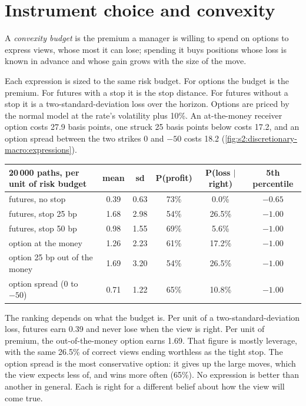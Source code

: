 \section{Instrument choice and convexity}

\begin{definition}\label{def:s2:discretionary-macro:convexity}
A \emph{convexity budget} is the premium a manager is willing to spend on options to express views, whose most it can lose;
spending it buys positions whose loss is known in advance and whose gain grows with the size of the move.
\end{definition}

Each expression is sized to the same risk budget. For options the budget is the premium. For futures with a stop it is the stop distance. For futures
without a stop it is a two-standard-deviation loss over the horizon. Options are priced by the normal model at the rate's volatility plus 10\%. An
at-the-money receiver option costs 27.9 basis points, one struck 25 basis points below costs 17.2, and an option spread between the two strikes 0 and
$-50$ costs 18.2 (\cref{fig:s2:discretionary-macro:expressions}).

\begin{center}
\small
\begin{tabular}{@{}lccccc@{}}
\toprule
20\,000 paths, per unit of risk budget & mean & sd & P(profit) & P(loss $|$ right) & 5th percentile\\
\midrule
futures, no stop & 0.39 & 0.63 & 73\% & 0.0\% & $-0.65$\\
futures, stop 25 bp & 1.68 & 2.98 & 54\% & 26.5\% & $-1.00$\\
futures, stop 50 bp & 0.98 & 1.55 & 69\% & 5.6\% & $-1.00$\\
option at the money & 1.26 & 2.23 & 61\% & 17.2\% & $-1.00$\\
option 25 bp out of the money & 1.69 & 3.20 & 54\% & 26.5\% & $-1.00$\\
option spread (0 to $-50$) & 0.71 & 1.22 & 65\% & 10.8\% & $-1.00$\\
\bottomrule
\end{tabular}
\end{center}

The ranking depends on what the budget is. Per unit of a two-standard-deviation loss, futures earn 0.39 and never lose when the view is right. Per unit
of premium, the out-of-the-money option earns 1.69. That figure is mostly leverage, with the same 26.5\% of correct views ending worthless as the tight
stop. The option spread is the most conservative option: it gives up the large moves, which the view expects less of, and wins more often (65\%). No
expression is better than another in general. Each is right for a different belief about how the view will come true.

